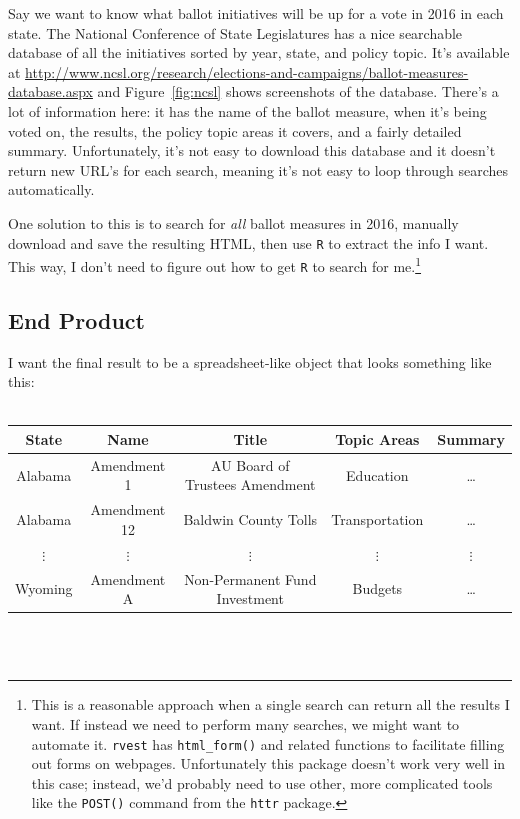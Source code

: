 \documentclass{article}\usepackage[]{graphicx}\usepackage[]{color}
\begin{document}
Say we want to know what ballot initiatives will be up for a vote in 2016 in each state. The National Conference of State Legislatures has a nice searchable database of all the initiatives sorted by year, state, and policy topic. It's available at \href{http://www.ncsl.org/research/elections-and-campaigns/ballot-measures-database.aspx}{http://www.ncsl.org/research/elections-and-campaigns/ballot-measures-database.aspx} and Figure~\ref{fig:ncsl} shows screenshots of the database. There's a lot of information here: it has the name of the ballot measure, when it's being voted on, the results, the policy topic areas it covers, and a fairly detailed summary. Unfortunately, it's not easy to download this database and it doesn't return new URL's for each search, meaning it's not easy to loop through searches automatically. 

One solution to this is to search for \textit{all} ballot measures in 2016, manually download and save the resulting HTML, then use \texttt{R} to extract the info I want. This way, I don't need to figure out how to get \texttt{R} to search for me.\footnote{This is a reasonable approach when a single search can return all the results I want. If instead we need to perform many searches, we might want to automate it. \texttt{rvest} has \texttt{html\_form()} and related functions to facilitate filling out forms on webpages. Unfortunately this package doesn't work very well in this case; instead, we'd probably need to use other, more complicated tools like the \texttt{POST()} command from the \texttt{httr} package.} 

\subsection{End Product}

I want the final result to be a spreadsheet-like object that looks something like this:~\\\\

\begin{tabular}{ccccc}
  \textbf{State} & \textbf{Name} & \textbf{Title} &  \textbf{Topic Areas} & \textbf{Summary} \\ \midrule
  Alabama & Amendment 1 & AU Board of Trustees Amendment & Education & \dots \\
  Alabama & Amendment 12 & Baldwin County Tolls & Transportation & \dots \\
  $\vdots$ & $\vdots$ & $\vdots$ & $\vdots$ & $\vdots$ \\
  Wyoming & Amendment A & Non-Permanent Fund Investment & Budgets & \dots \\\bottomrule
\end{tabular}
~\\ \\
\end{document}
